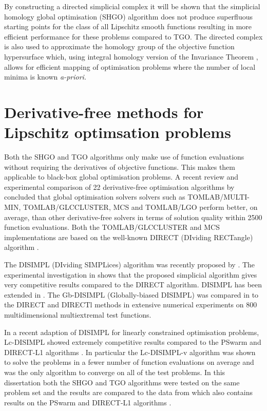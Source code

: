 By constructing a directed simplicial complex it will be shown that the simplicial homology global optimisation (SHGO) algorithm does not produce superfluous starting points for the class of all Lipschitz smooth functions resulting in more efficient performance for these problems compared to TGO. The directed complex is also used to approximate the homology group of the objective function hypersurface which, using integral homology version of the Invariance Theorem \cite{Henle1979}, allows for efficient mapping of optimisation problems where the number of local minima is known \it{a-priori}\normalfont. %

\section{Derivative-free methods for Lipschitz optimsation problems}
Both the SHGO and TGO algorithms only make use of function evaluations without requiring the derivatives of objective functions. This makes them applicable to black-box global optimisation problems. A recent review and experimental comparison of 22 derivative-free optimisation algorithms by \citet{Rios2013} concluded that global optimisation solvers solvers such as TOMLAB/MULTI-MIN, TOMLAB/GLCCLUSTER, MCS and TOMLAB/LGO perform better, on average, than other derivative-free solvers in terms of solution quality within 2500 function evaluations. Both the TOMLAB/GLCCLUSTER and MCS \cite{Huyer1999} implementations are based on the well-known DIRECT (DIviding RECTangle) algorithm \cite{Jones1993}.
 
The DISIMPL (DIviding SIMPLices) algorithm was recently proposed by \citet{Paul2014b}. The experimental investigation in \cite{Paul2014b} shows that the proposed simplicial algorithm gives very competitive results compared to the DIRECT algorithm. DISIMPL has been extended in \cite{paulavivcius2014simplicial, Paul2014a}. The Gb-DISIMPL (Globally-biased DISIMPL) was compared in \cite{Paul2014a} to the DIRECT and DIRECTl methods in extensive numerical experiments on 800 multidimensional multiextremal test functions.

In a recent adaption of DISIMPL for linearly constrained optimisation problems, Lc-DISIMPL \cite{Paul2016} showed extremely competitive results compared to the PSwarm \cite{Vaz2008} and DIRECT-L1 algorithms \cite{finkel2003direct}. In particular the Lc-DISIMPL-v algorithm was shown to solve the problems in a fewer number of function evaluations on average and was the only algorithm to converge on all of the test problems. In this dissertation both the SHGO and TGO algorithms were tested on the same problem set and the results are compared to the data from \cite{Paul2016} which also contains results on the PSwarm \cite{Vaz2008} and DIRECT-L1 algorithms \cite{finkel2003direct}.

